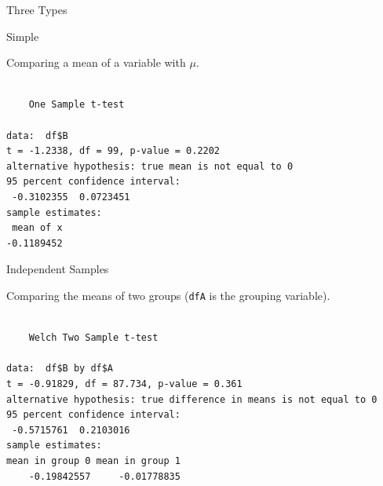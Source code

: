 \begin{frame}[fragile]{Three Types}
\end{frame}

\begin{frame}[fragile]{Simple}

\center
Comparing a mean of a variable with \(\mu\).

\begin{Shaded}
\begin{Highlighting}[]
\OperatorTok{$} \NormalTok{)}
\end{Highlighting}
\end{Shaded}

\begin{verbatim}

    One Sample t-test

data:  df$B
t = -1.2338, df = 99, p-value = 0.2202
alternative hypothesis: true mean is not equal to 0
95 percent confidence interval:
 -0.3102355  0.0723451
sample estimates:
 mean of x 
-0.1189452 
\end{verbatim}

\end{frame}

\begin{frame}[fragile]{Independent Samples}

\center
Comparing the means of two groups (\texttt{dfA} is the grouping
variable).

\begin{Shaded}
\begin{Highlighting}[]
\OperatorTok{$}\OperatorTok{~}\StringTok{ }\OperatorTok{$}
\end{Highlighting}
\end{Shaded}

\begin{verbatim}

    Welch Two Sample t-test

data:  df$B by df$A
t = -0.91829, df = 87.734, p-value = 0.361
alternative hypothesis: true difference in means is not equal to 0
95 percent confidence interval:
 -0.5715761  0.2103016
sample estimates:
mean in group 0 mean in group 1 
    -0.19842557     -0.01778835 
\end{verbatim}

\end{frame}


